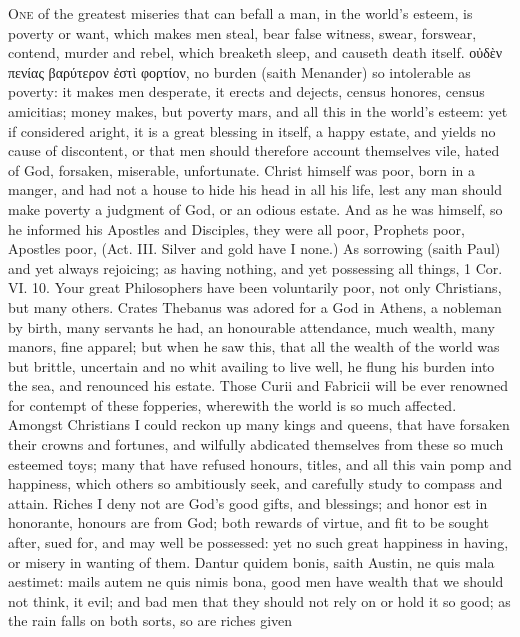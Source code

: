 {\lettrine{O}{ne} of the greatest miseries that can befall a man, in the world's
esteem, is poverty or want, which makes men steal, bear false witness,
swear, forswear, contend, murder and rebel, which breaketh sleep, and
causeth death itself. \textgreek{οὐδὲν πενίας βαρύτερον ἐστὶ φορτίον}, no burden
(saith Menander) so intolerable as poverty: it makes men
desperate, it erects and dejects, census honores, census amicitias;
money makes, but poverty mars, \etc{} and all this in the world's esteem:
yet if considered aright, it is a great blessing in itself, a happy
estate, and yields no cause of discontent, or that men should therefore
account themselves vile, hated of God, forsaken, miserable,
unfortunate. Christ himself was poor, born in a manger, and had not a
house to hide his head in all his life, lest any man should make
poverty a judgment of God, or an odious estate. And as he was himself,
so he informed his Apostles and Disciples, they were all poor, Prophets
poor, Apostles poor, (Act. III. Silver and gold have I none.) As
sorrowing (saith Paul) and yet always rejoicing; as having nothing, and
yet possessing all things, 1 Cor. VI. 10. Your great Philosophers have
been voluntarily poor, not only Christians, but many others. Crates
Thebanus was adored for a God in Athens, a nobleman by birth,
many servants he had, an honourable attendance, much wealth, many
manors, fine apparel; but when he saw this, that all the wealth of the
world was but brittle, uncertain and no whit availing to live well, he
flung his burden into the sea, and renounced his estate. Those Curii
and Fabricii will be ever renowned for contempt of these fopperies,
wherewith the world is so much affected. Amongst Christians I could
reckon up many kings and queens, that have forsaken their crowns and
fortunes, and wilfully abdicated themselves from these so much esteemed
toys; many that have refused honours, titles, and all this vain
pomp and happiness, which others so ambitiously seek, and carefully
study to compass and attain. Riches I deny not are God's good gifts,
and blessings; and honor est in honorante, honours are from God; both
rewards of virtue, and fit to be sought after, sued for, and may well
be possessed: yet no such great happiness in having, or misery in
wanting of them. Dantur quidem bonis, saith Austin, ne quis mala
aestimet: mails autem ne quis nimis bona, good men have wealth that we
should not think, it evil; and bad men that they should not rely on or
hold it so good; as the rain falls on both sorts, so are riches given
}
